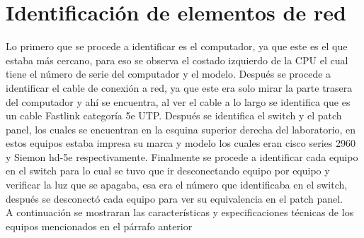 \documentclass{udpreport}
\begin{document}
	\section{Identificación de elementos de red}
		Lo primero que se procede a identificar es el computador, ya que este es el que estaba más cercano, para eso se observa  		el costado izquierdo de la CPU el cual tiene el número de serie del computador y el modelo. Después se procede a identificar 		el cable de conexión a red,  ya que este era solo mirar la parte trasera del computador y ahí se encuentra, al ver el cable 		a lo largo se identifica que es un cable Fastlink categoría 5e UTP. Después se identifica el switch y el patch panel, los 		cuales se encuentran en la esquina superior derecha del laboratorio, en estos equipos estaba impresa su marca y modelo 		los cuales eran cisco series 2960 y Siemon hd-5e respectivamente. Finalmente se procede a identificar cada equipo en 			el switch para lo cual se tuvo que ir desconectando equipo por equipo y verificar la luz que se apagaba, esa era el 		número que identificaba en el switch, después se desconectó cada equipo para ver su equivalencia en el patch panel.\\
		A continuación se mostraran las características y especificaciones técnicas de los equipos mencionados en el párrafo 			anterior\\
\end{document}

